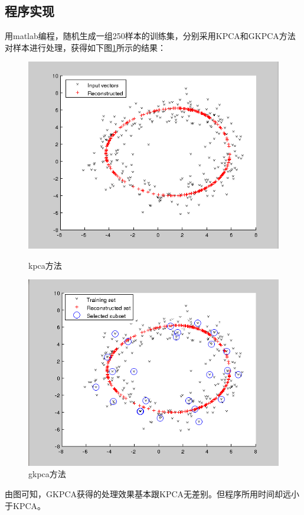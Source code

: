 \documentclass[12pt,a4paper,CJK]{beamer}
\begin{document}
\begin{CJK*}{UTF8}{gkai}
\begin{frame}{\subsecname}
\end{frame}


\subsection{程序实现}
\begin{frame}{\subsecname}
用matlab编程，随机生成一组250样本的训练集，分别采用KPCA和GKPCA方法对样本进行处理，获得如下图\ref{greedkpca}所示的结果：
\begin{figure}[!htbp]
  \begin{minipage}[t]{0.48\linewidth}
    \centering
    \includegraphics[width=\textwidth]{figs/kpca.png}
    \caption{kpca方法\label{kpca}}
  \end{minipage}
  \hfill
  \begin{minipage}[t]{0.48\linewidth}
    \centering
    \includegraphics[width=\textwidth]{figs/gkpca.png}
    \caption{gkpca方法\label{kpca}}
  \end{minipage}
  \label{greedkpca}
\end{figure}
由图可知，GKPCA获得的处理效果基本跟KPCA无差别。但程序所用时间却远小于KPCA。
\end{frame}




\end{CJK*}
\end{document}
